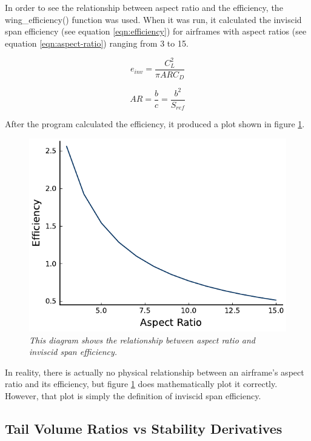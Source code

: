 \documentclass{journal}
\begin{document}
	In order to see the relationship between aspect ratio and the efficiency, the wing\_efficiency() function was used. When it was run, it calculated the inviscid span efficiency (see equation \ref{eqn:efficiency}) for airframes with aspect ratios (see equation \ref{eqn:aspect-ratio}) ranging from 3 to 15.
	
	\begin{equation}
		e_{inv} = \frac{C_L^2}{\pi{ARC_D}}
		\label{eqn:efficiency}
	\end{equation}

	\begin{equation}
		AR = \frac{b}{c} = \frac{b^2}{S_{ref}}
		\label{eqn:aspect-ratio}
	\end{equation}
	
	After the program calculated the efficiency, it produced a plot shown in figure \ref{fig:efficiency}. \\
	
	\begin{figure}[H]
		\centering
		\includegraphics{../graphics/efficiency.pdf}
		\caption{\emph{This diagram shows the relationship between aspect ratio and inviscid span efficiency.}}
		\label{fig:efficiency}
	\end{figure}

	In reality, there is actually no physical relationship between an airframe's aspect ratio and its efficiency, but figure \ref{fig:efficiency} does mathematically plot it correctly. However, that plot is simply the definition of inviscid span efficiency. \\
	
	\subsection{Tail Volume Ratios vs Stability Derivatives}
	
\end{document}
